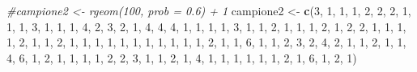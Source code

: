 \documentclass[]{book}
\newenvironment{Shaded}{\begin{snugshade}}{\end{snugshade}}
\newcommand{\KeywordTok}[1]{\textcolor[rgb]{0.13,0.29,0.53}{\textbf{#1}}}
\newcommand{\DecValTok}[1]{\textcolor[rgb]{0.00,0.00,0.81}{#1}}
\newcommand{\StringTok}[1]{\textcolor[rgb]{0.31,0.60,0.02}{#1}}
\newcommand{\CommentTok}[1]{\textcolor[rgb]{0.56,0.35,0.01}{\textit{#1}}}
\newcommand{\NormalTok}[1]{#1}
\begin{document}
\begin{Shaded}
\begin{Highlighting}[]
\CommentTok{#campione2 <- rgeom(100, prob = 0.6) + 1}
\NormalTok{campione2 <-}\StringTok{ }\KeywordTok{c}\NormalTok{(}\DecValTok{3}\NormalTok{, }\DecValTok{1}\NormalTok{, }\DecValTok{1}\NormalTok{, }\DecValTok{1}\NormalTok{, }\DecValTok{2}\NormalTok{, }\DecValTok{2}\NormalTok{, }\DecValTok{2}\NormalTok{, }\DecValTok{1}\NormalTok{, }\DecValTok{1}\NormalTok{, }\DecValTok{1}\NormalTok{, }\DecValTok{3}\NormalTok{, }\DecValTok{1}\NormalTok{, }\DecValTok{1}\NormalTok{, }\DecValTok{1}\NormalTok{, }\DecValTok{4}\NormalTok{, }\DecValTok{2}\NormalTok{, }\DecValTok{3}\NormalTok{, }\DecValTok{2}\NormalTok{, }\DecValTok{1}\NormalTok{, }\DecValTok{4}\NormalTok{, }
               \DecValTok{4}\NormalTok{, }\DecValTok{4}\NormalTok{, }\DecValTok{1}\NormalTok{, }\DecValTok{1}\NormalTok{, }\DecValTok{1}\NormalTok{, }\DecValTok{1}\NormalTok{, }\DecValTok{3}\NormalTok{, }\DecValTok{1}\NormalTok{, }\DecValTok{1}\NormalTok{, }\DecValTok{2}\NormalTok{, }\DecValTok{1}\NormalTok{, }\DecValTok{1}\NormalTok{, }\DecValTok{1}\NormalTok{, }\DecValTok{2}\NormalTok{, }\DecValTok{1}\NormalTok{, }\DecValTok{2}\NormalTok{, }\DecValTok{2}\NormalTok{, }\DecValTok{1}\NormalTok{, }\DecValTok{1}\NormalTok{, }\DecValTok{1}\NormalTok{, }
               \DecValTok{1}\NormalTok{, }\DecValTok{2}\NormalTok{, }\DecValTok{1}\NormalTok{, }\DecValTok{1}\NormalTok{, }\DecValTok{2}\NormalTok{, }\DecValTok{1}\NormalTok{, }\DecValTok{1}\NormalTok{, }\DecValTok{1}\NormalTok{, }\DecValTok{1}\NormalTok{, }\DecValTok{1}\NormalTok{, }\DecValTok{1}\NormalTok{, }\DecValTok{1}\NormalTok{, }\DecValTok{1}\NormalTok{, }\DecValTok{1}\NormalTok{, }\DecValTok{1}\NormalTok{, }\DecValTok{1}\NormalTok{, }\DecValTok{2}\NormalTok{, }\DecValTok{1}\NormalTok{, }\DecValTok{1}\NormalTok{, }\DecValTok{6}\NormalTok{, }
               \DecValTok{1}\NormalTok{, }\DecValTok{1}\NormalTok{, }\DecValTok{2}\NormalTok{, }\DecValTok{3}\NormalTok{, }\DecValTok{2}\NormalTok{, }\DecValTok{4}\NormalTok{, }\DecValTok{2}\NormalTok{, }\DecValTok{1}\NormalTok{, }\DecValTok{1}\NormalTok{, }\DecValTok{2}\NormalTok{, }\DecValTok{1}\NormalTok{, }\DecValTok{1}\NormalTok{, }\DecValTok{4}\NormalTok{, }\DecValTok{6}\NormalTok{, }\DecValTok{1}\NormalTok{, }\DecValTok{2}\NormalTok{, }\DecValTok{1}\NormalTok{, }\DecValTok{1}\NormalTok{, }\DecValTok{1}\NormalTok{, }\DecValTok{1}\NormalTok{, }
               \DecValTok{2}\NormalTok{, }\DecValTok{2}\NormalTok{, }\DecValTok{3}\NormalTok{, }\DecValTok{1}\NormalTok{, }\DecValTok{1}\NormalTok{, }\DecValTok{2}\NormalTok{, }\DecValTok{1}\NormalTok{, }\DecValTok{4}\NormalTok{, }\DecValTok{1}\NormalTok{, }\DecValTok{1}\NormalTok{, }\DecValTok{1}\NormalTok{, }\DecValTok{1}\NormalTok{, }\DecValTok{1}\NormalTok{, }\DecValTok{1}\NormalTok{, }\DecValTok{2}\NormalTok{, }\DecValTok{1}\NormalTok{, }\DecValTok{6}\NormalTok{, }\DecValTok{1}\NormalTok{, }\DecValTok{2}\NormalTok{, }\DecValTok{1}\NormalTok{)}


\end{Highlighting}
\end{Shaded}
\end{document}
